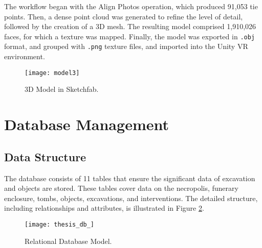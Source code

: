 The workflow began with the Align Photos operation, which produced 91,053 tie points. Then, a dense point cloud was generated to refine the level of detail, followed by the creation of a \gls{3D} mesh. The resulting model comprised 1,910,026 faces, for which a texture was mapped.
Finally, the model was exported in \texttt{.obj} format, and grouped with \texttt{.png} texture files, and imported into the Unity \gls{VR} environment.

\begin{figure}[h!]
    \centering
    \texttt{[image: model3]}
    \caption{\gls{3D} Model in Sketchfab.}
    \label{fig:model3}
\end{figure}

\section{Database Management}
\subsection{Data Structure}

The database consists of 11 tables that ensure the significant data of excavation and objects are stored. %
These tables cover data on the necropolis, funerary enclosure, tombs, objects, excavations, and interventions.
The detailed structure, including relationships and attributes, is illustrated in Figure \ref{fig:database}.

\begin{figure}[h!]
    \centering
    \texttt{[image: thesis\_db\_]}
    \caption{Relational Database Model.} 
    \label{fig:database}
\end{figure}


